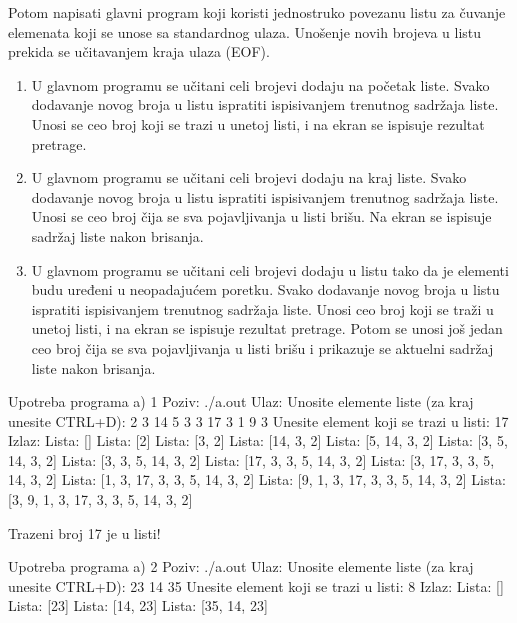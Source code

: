 \begin{Exercise}[label=601]
Potom napisati glavni program koji koristi jednostruko povezanu listu za čuvanje elemenata koji se unose sa standardnog ulaza. 
Unošenje novih brojeva u listu prekida se učitavanjem kraja ulaza (EOF). 
\begin{enumerate}
\item U glavnom programu se učitani celi brojevi dodaju na početak liste. 
    Svako dodavanje novog broja u listu ispratiti ispisivanjem trenutnog sadržaja liste. 
    Unosi se ceo broj koji se trazi u unetoj listi, i na ekran se ispisuje rezultat pretrage. 
\item U glavnom programu se učitani celi brojevi dodaju na kraj liste. 
    Svako dodavanje novog broja u listu ispratiti ispisivanjem trenutnog sadržaja liste. 
    Unosi se ceo broj čija se sva pojavljivanja u listi brišu. Na ekran se ispisuje sadržaj liste nakon brisanja.
\item U glavnom programu se učitani celi brojevi dodaju u listu tako da je elementi budu uređeni u neopadajućem poretku. 
    Svako dodavanje novog broja u listu ispratiti ispisivanjem trenutnog sadržaja liste. 
    Unosi ceo broj koji se traži u unetoj listi, i na ekran se ispisuje rezultat pretrage. 
    Potom se unosi još jedan ceo broj čija se sva pojavljivanja u listi brišu i prikazuje se aktuelni sadržaj liste nakon brisanja.
\end{enumerate}
\begin{maxitest}
\begin{test}{Upotreba programa a) 1}
Poziv: ./a.out
Ulaz:
  Unosite elemente liste (za kraj unesite CTRL+D): 2 3 14 5 3 3 17 3 1 9 3
  Unesite element koji se trazi u listi: 17
Izlaz:
  Lista: []
  Lista: [2]
  Lista: [3, 2]
  Lista: [14, 3, 2]
  Lista: [5, 14, 3, 2]
  Lista: [3, 5, 14, 3, 2]
  Lista: [3, 3, 5, 14, 3, 2]
  Lista: [17, 3, 3, 5, 14, 3, 2]
  Lista: [3, 17, 3, 3, 5, 14, 3, 2]
  Lista: [1, 3, 17, 3, 3, 5, 14, 3, 2]
  Lista: [9, 1, 3, 17, 3, 3, 5, 14, 3, 2]
  Lista: [3, 9, 1, 3, 17, 3, 3, 5, 14, 3, 2]

  Trazeni broj 17 je u listi!
\end{test}
\end{maxitest}
\begin{maxitest}
\begin{test}{Upotreba programa a) 2}
Poziv: ./a.out
Ulaz:
  Unosite elemente liste (za kraj unesite CTRL+D): 23 14 35
  Unesite element koji se trazi u listi: 8
Izlaz:
  Lista: []
  Lista: [23]
  Lista: [14, 23]
  Lista: [35, 14, 23]
  

\end{test}
\end{maxitest}
\end{Exercise}
